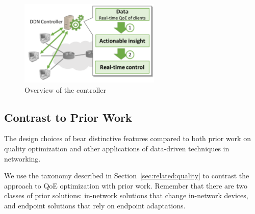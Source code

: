 \begin{figure}[t!]
\centering
\includegraphics[width=0.6\textwidth]{figures/overview-ddn-arch.pdf}
\caption{Overview of the \ddn controller}
\label{fig:intro-contribution}
\end{figure}

\subsection{Contrast to Prior Work}
\label{subsec:overview:contrast}

The design choices of \ddn bear distinctive features compared to both prior work on quality
optimization and other applications of data-driven techniques in networking.

We use the taxonomy described in Section~\ref{sec:related:quality} to 
contrast the \ddn approach to QoE optimization with prior work.
Remember that there are two classes of prior solutions: in-network solutions that change 
in-network devices, and endpoint solutions that rely on endpoint adaptations.


